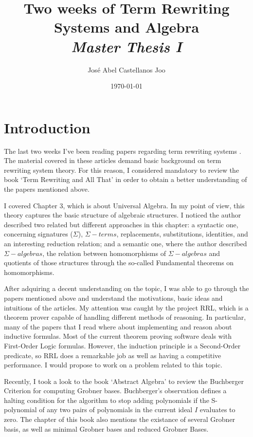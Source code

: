 \documentclass[a4paper, 11pt]{article}
\author{Jos\'e Abel Castellanos Joo}
\title{Two weeks of Term Rewriting Systems and Algebra \\ \textit{Master Thesis I} 
}
\affil{Department of Computer Science

  University of New Mexico

  Albuquerque, NM 87131}
\date{\today}
\begin{document}
\maketitle

\section{Introduction}

The last two weeks I've been reading papers regarding term rewriting systems \cite{falke2006inductive, DBLP:conf/rta/Kapur97, DBLP:journals/jar/KapurS96, KAPUR199591}. The material covered in these articles demand basic background on term rewriting system theory. For this reason, I considered mandatory to review the book `Term Rewriting and All That' \cite{Baader:1998:TR:280474} in order to obtain a better understanding of the papers mentioned above.

I covered Chapter 3, which is about Universal Algebra. In my point of view, this theory captures the basic structure of algebraic structures. I noticed the author described two related but different approaches in this chapter: a syntactic one, concerning signatures ($\Sigma$), $\Sigma-terms$, replacements, substitutions, identities, and an interesting reduction relation; and a semantic one, where the author described $\Sigma-algebras$, the relation between homomorphisms of $\Sigma-algebras$ and quotients of those structures through the so-called Fundamental theorems on homomorphisms.

After adquiring a decent understanding on the topic, I was able to go through the papers mentioned above and understand the motivations, basic ideas and intuitions of the articles. My attention was caught by the project RRL, which is a theorem prover capable of handling different methods of reasoning. In particular, many of the papers that I read where about implementing and reason about inductive formulas. Most of the current theorem proving software deals with First-Order Logic formulas. However, the induction principle is a Second-Order predicate, so RRL does a remarkable job as well as having a competitive performance. I would propose to work on a problem related to this topic.

Recently, I took a look to the book `Abstract Algebra' \cite{dummit2004abstract} to review the Buchberger Criterion for computing Grobner bases. Buchberger's observation defines a halting condition for the algorithm to stop adding polynomials if the S-polynomial of any two pairs of polynomials in the current ideal $I$ evaluates to zero. The chapter of this book also mentions the existance of several Grobner basis, as well as minimal Grobner bases and reduced Grobner Bases.  
\end{document}
